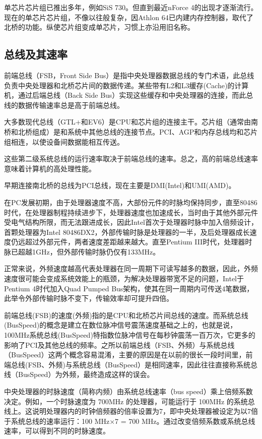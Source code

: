 单芯片芯片组已推出多年，例如SiS 730。但直到最近nForce 4的出现才逐渐流行。现在的单芯片芯片组，不像以往般复杂，因Athlon 64已内建内存控制器，取代了北桥的功能。纵使芯片组变成单芯片，习惯上亦沿用旧名称。

\subsection{总线及其速率}

前端总线（FSB，Front Side Bus）是指中央处理器数据总线的专门术语，此总线负责中央处理器和北桥芯片间的数据传递。某些带有L2和L3缓存(Cache)的计算机，通过后端总线（Back Side Bus）实现这些缓存和中央处理器的连接，而此总线的数据传输速率总是高于前端总线。

大多数现代总线（GTL+和EV6）是CPU和芯片组的连接主干。芯片组（通常由南桥和北桥组成）是和系统中其他总线的连接节点。PCI、AGP和内存总线均和芯片组相连，以使设备间数据能相互传送。

这些第二级系统总线的运行速率取决于前端总线的速率。总之，高的前端总线速率意味着计算机的高处理性能。

早期连接南北桥的总线为PCI总线，现在主要是DMI(Intel)和UMI(AMD)。

在PC发展初期，由于处理器速度不高，大部份元件的时脉均保持同步，直至80486时代，在处理器制程持续进步下，处理器速度也加速成长，当时由于其他外部元件受电气结构所限，而无法跟进成长，因此Intel首次于处理器时脉中加入倍频设计，首颗处理器为Intel 80486DX2，外部传输时脉是处理器的一半，及后处理器成长速度仍远超过外部元件，两者速度差距越来越大。直至Pentium III时代，处理器时脉已超越1GHz，但外部传输时脉仍仅有133MHz。

正常来说，外频速度越高代表处理器在同一周期下可读写越多的数据，因此，外频速度很可能会变成系统效能上的瓶颈，为解决处理器带宽不足的问题，Intel于Pentium 4时代加入Quad Pumped Bus架构，使其在同一周期内可传送4笔数据，此举令外部传输时脉不变下，传输效率却可提升四倍。

前端总线(FSB)的速度(外频)指的是CPU和北桥芯片间总线的速度。而系统总线(BusSpeed)的概念是建立在数位脉冲信号震荡速度基础之上的，也就是说，100MHz系统总线(BusSpeed)特指数位脉冲信号在每秒钟震荡一百万次，它更多的影响了PCI及其他总线的频率。之所以前端总线（FSB、外频）与系统总线（BusSpeed）这两个概念容易混淆，主要的原因是在以前的很长一段时间里，前端总线(FSB、外频)与系统总线（BusSpeed）是相同速率，因此往往直接称系统总线（BusSpeed）为外频，最终造成这样的误会。

中央处理器的时脉速度（简称内频）由系统总线速率（bus speed）乘上倍频系数决定。例如，一个时脉速度为 700MHz 的处理器，可能运行于 100MHz 的系统总线上。这说明处理器内的时钟倍频器的倍率设置为7，即中央处理器被设定为以7倍于系统总线的速率运行：100 MHz×7 = 700 MHz。通过改变倍频系数或系统总线速率，可以得到不同的时脉速度。














